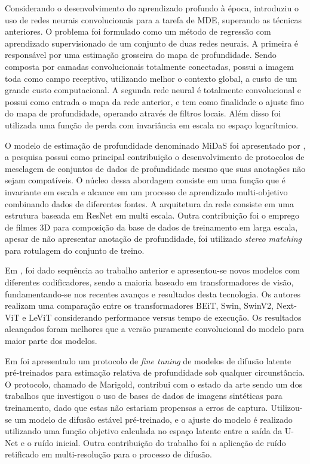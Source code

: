 Considerando o desenvolvimento do aprendizado profundo à época,  introduziu o uso de redes neurais convolucionais para a tarefa de MDE, superando as técnicas anteriores. O problema foi formulado como um método de regressão com aprendizado supervisionado de um conjunto de duas redes neurais. A primeira é responsável por uma estimação grosseira do mapa de profundidade. Sendo composta por camadas convolucionais totalmente conectadas, possui a imagem toda como campo receptivo, utilizando melhor o contexto global, a custo de um grande custo computacional. A segunda rede neural é totalmente convolucional e possui como entrada o mapa da rede anterior, e tem como finalidade o ajuste fino do mapa de profundidade, operando através de filtros locais. Além disso foi utilizada uma função de perda com invariância em escala no espaço logarítmico.

O modelo de estimação de profundidade denominado MiDaS foi apresentado por , a pesquisa possui como principal contribuição o desenvolvimento de protocolos de mesclagem de conjuntos de dados de profundidade mesmo que suas anotações não sejam compatíveis. O núcleo dessa abordagem consiste em uma função que é invariante em escala e alcance em um processo de aprendizado multi-objetivo combinando dados de diferentes fontes. A arquitetura da rede consiste em uma estrutura baseada em ResNet em multi escala. Outra contribuição foi o emprego de filmes 3D para composição da base de dados de treinamento em larga escala, apesar de não apresentar anotação de profundidade, foi utilizado \textit{stereo matching} para rotulagem do conjunto de treino. 

Em \cite{birkl2023midas}, foi dado sequência ao trabalho anterior e apresentou-se novos modelos com diferentes codificadores, sendo a maioria baseado em transformadores de visão, fundamentando-se nos recentes avanços e resultados desta tecnologia. Os autores realizam uma comparação entre os transformadores BEiT, Swin, SwinV2, Next-ViT e LeViT considerando performance versus tempo de execução. Os resultados alcançados foram melhores que a versão puramente convolucional do modelo para  maior parte dos modelos. 

Em \cite{ke2024repurposing} foi apresentado um protocolo de \textit{fine tuning} de modelos de difusão latente pré-treinados para estimação relativa de profundidade sob qualquer circunstância. O protocolo, chamado de Marigold, contribui com o estado da arte sendo um dos trabalhos que investigou o uso de bases de dados de imagens sintéticas para treinamento, dado que estas não estariam propensas a erros de captura. Utilizou-se um modelo de difusão estável pré-treinado, e o ajuste do modelo é realizado utilizando uma função objetivo calculada no espaço latente entre a saída da U-Net e o ruído inicial. Outra contribuição do trabalho foi a aplicação de ruído retificado em multi-resolução para o processo de difusão. 

